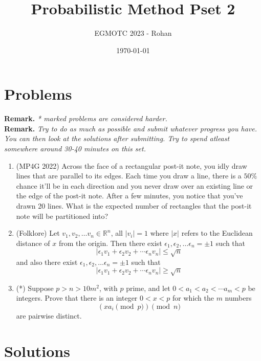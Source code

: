\documentclass[12pt]{article}
\title{Probabilistic Method Pset 2}
\author{EGMOTC 2023 - Rohan}
\date{\today}
\begin{document}
\maketitle

\newcommand{\localtextbulletone}{\textcolor{black}{\raisebox{.45ex}{\rule{.6ex}{.6ex}}}}
\renewcommand{\labelitemi}{\localtextbulletone}

\section*{Problems}
\vspace{1cm}
\thispagestyle{empty}

\textbf{Remark.} \textit{* marked problems are considered harder.\\ }
\textbf{Remark.} \textit{Try to do as much as possible and submit whatever progress you have. You can then look at the solutions after submitting. Try to spend atleast somewhere around 30-40 minutes on this set.}

\begin{enumerate}
    \item (MP4G 2022) Across the face of a rectangular post-it note, you idly draw lines that are parallel to its edges. Each time you draw a line, there is a $50\%$ chance it'll be in each direction and you never draw over an existing line or the edge of the post-it note. After a few minutes, you notice that you've drawn 20 lines. What is the expected number of rectangles that the post-it note will be partitioned into?
    \item (Folklore) Let $v_1,v_2,\ldots v_n\in \mathbb{R}^n$, all $|v_i|=1$ where $|x|$ refers to the Euclidean distance of $x$ from the origin.  Then there exist $\epsilon_1, \epsilon_2, \ldots \epsilon_n = \pm 1$ such that \[|\epsilon_1v_1+\epsilon_2v_2+\cdots \epsilon_nv_n|\le \sqrt{n}\] and also there exist $\epsilon_1, \epsilon_2, \ldots \epsilon_n = \pm 1$ such that \[|\epsilon_1v_1+\epsilon_2v_2+\cdots \epsilon_nv_n|\ge \sqrt{n}\] 
    \item (*) Suppose $p>n>10m^2$, with $p$ prime, and let $0<a_1<a_2<\cdots a_m<p$ be integers. Prove that there is an integer $0<x<p$ for which the $m$ numbers \[(xa_i \pmod{p})\pmod n\] are pairwise distinct.
\end{enumerate}

\section*{Solutions}
\end{document}
